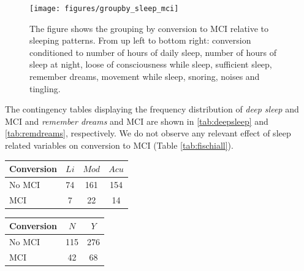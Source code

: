 \documentclass[11pt]{article}
\theoremstyle{definition}
\theoremstyle{remark}
\begin{document}
\begin{figure}[H]
        \centering
        \texttt{[image: figures/groupby\_sleep\_mci]}
        \caption{The figure shows the grouping by conversion to MCI relative to sleeping patterns. From up left to bottom right: conversion conditioned to number of hours of daily sleep, number of hours of sleep at night, loose of consciousness while sleep, sufficient sleep, remember dreams, movement while sleep, snoring, noises and tingling.} 
        \label{fig:groupby_sleep_mci}
\end{figure}

The contingency tables displaying the frequency distribution of \emph{deep sleep} and MCI and \emph{remember dreams} and MCI are shown in \ref{tab:deepsleep} and \ref{tab:remdreams}, respectively. 
We do not observe any relevant effect of sleep related variables on conversion to MCI (Table \ref{tab:fischiall}).


\begin{minipage}[b]{.40\textwidth}
   \centering
    \begin{tabular}[t]{lccc}
    \hline
    Conversion&{$Li$}&{$Mod$}&{$Acu$} \\
    \hline
    No MCI&74&161 & 154\\
    MCI&7 &  22  & 14\\
    \hline
  \end{tabular}
   \label{tab:deepsleep}
\end{minipage}\qquad
\begin{minipage}[b]{.40\textwidth}
   \centering
    \begin{tabular}[t]{lcc}
    \hline
    Conversion&{$N$}&{$Y$} \\
    \hline
    No MCI&115&276\\
    MCI&42&68\\
    \hline
  \end{tabular}
   \label{tab:remdreams}
\end{minipage}
\end{document}
